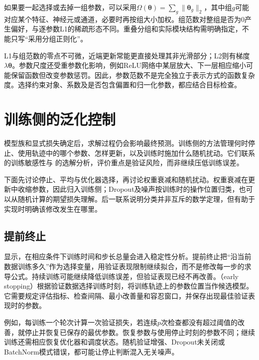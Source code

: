 如果要一起选择或去掉一组参数，可以采用$\Omega(\bm\theta)=\sum_g\lVert\bm\theta_g\rVert_2$，其中组$g$可能对应某个特征、神经元或通道，必要时再按组大小加权。组范数对整组是否为0产生偏好，与逐参数L1的稀疏形态不同。重叠分组和实际模块结构需明确指定，不能只写“采用分组正则化”。

L1与组范数的零点不可微，近端更新常能更直接处理其非光滑部分；L2则有梯度$\lambda\bm\theta$。参数尺度还受重参数化影响，例如ReLU网络中某层放大、下一层相应缩小可能保留函数但改变参数惩罚。因此，参数范数不是完全独立于表示方式的函数复杂度。选择约束对象、系数及是否包含偏置和归一化参数，都应结合目标检查。

\section{训练侧的泛化控制}
\label{sec:generalization-training-process}

模型族和显式损失确定后，求解过程仍会影响最终预测。训练侧的方法管理何时停止、使用轨迹中的哪个参数、怎样更新，以及训练时施加什么随机扰动。它们联系
的训练敏感性与
的选解分析，评价重点是验证风险，而非继续压低训练误差。

下面先讨论停止、平均与优化器选择，再讨论权重衰减和随机扰动。权重衰减在更新中收缩参数，因此归入训练侧；Dropout及噪声按训练时的操作位置归类，也可以从随机计算的期望损失理解。后一联系说明分类并非互斥的数学定理，但有助于实现时明确该修改发生在哪里。

\subsection{提前终止}
\label{sec:generalization-early-stopping}

显示，在相应条件下训练时间和步长总量会进入稳定性分析。提前终止把“沿当前数据训练多久”作为选择变量，用验证表现限制继续拟合，而不是修改每一步的求导公式。持续训练可能继续降低训练误差，但验证表现已经不再改善。（early stopping）根据验证数据选择训练时刻，将训练轨迹上的参数位置当作候选模型。它需要规定评估指标、检查间隔、最小改善量和容忍窗口，并保存出现最佳验证表现时的参数。

例如，每训练一个轮次计算一次验证损失，若连续$p$次检查都没有超过阈值的改善，就停止并恢复已保存的最优参数。恢复参数与使用停止时刻的参数不同；继续训练还需相应恢复优化器和调度状态。随机验证增强、Dropout未关闭或BatchNorm模式错误，都可能让停止判断混入无关噪声。

